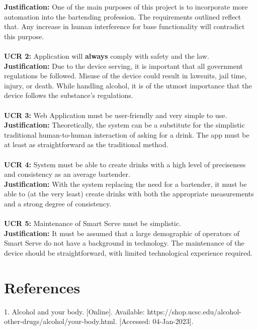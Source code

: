 \documentclass{article}
\begin{document}
    \noindent\textbf{Justification: }One of the main purposes of this project is to incorporate more automation into the bartending profession. The requirements outlined reflect that. Any increase in human interference for base functionality will contradict this purpose. \\\\
    \noindent\textbf{UCR 2:} Application will \textbf{always} comply with safety and the law. \\

    \noindent\textbf{Justification: }Due to the device serving, it is important that all government regulations be followed. Misuse of the device could result in lawsuits, jail time, injury, or death. While handling alcohol, it is of the utmost importance that the device follows the substance's regulations.\\\\
    \noindent\textbf{UCR 3:} Web Application must be user-friendly and very simple to use.  \\

    \noindent\textbf{Justification: }Theoretically, the system can be a substitute for the simplistic traditional human-to-human interaction of asking for a drink. The app must be at least as straightforward as the traditional method.\\\\

    \noindent\textbf{UCR 4:} System must be able to create drinks with a high level of preciseness and consistency as an average bartender.  \\

    \noindent\textbf{Justification: }With the system replacing the need for a bartender, it must be able to (at the very least) create drinks with both the appropriate measurements and a strong degree of consistency.\\\\
    \noindent\textbf{UCR 5:} Maintenance of Smart Serve must be simplistic.  \\

    \noindent\textbf{Justification: }It must be assumed that a large demographic of operators of Smart Serve do not have a background in technology. The maintenance of the device should be straightforward, with limited technological experience required. 
\newpage
\section{References}
   1. Alcohol and your body. [Online]. Available: https://shop.ucsc.edu/alcohol-other-drugs/alcohol/your-body.html. [Accessed: 04-Jan-2023]. 
\newpage
\end{document}
